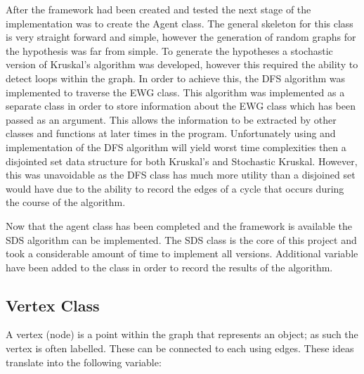 \documentclass{AISB2008}
\begin{document}
{After the framework had been created and tested the next stage of the implementation was to create the Agent class. The general skeleton for this class is very straight forward and simple, however the generation of random graphs for the hypothesis was far from simple. To generate the hypotheses a stochastic version of Kruskal’s algorithm was developed, however this required the ability to detect loops within the graph. In order to achieve this, the DFS algorithm was implemented to traverse the EWG class. This algorithm was implemented as a separate class in order to store information about the EWG class which has been passed as an argument. This allows the information to be extracted by other classes and functions at later times in the program. Unfortunately using and implementation of the DFS algorithm will yield worst time complexities then a disjointed set data structure for both Kruskal’s and Stochastic Kruskal. However, this was unavoidable as the DFS class has much more utility than a disjoined set would have due to the ability to record the edges of a cycle that occurs during the course of the algorithm.

Now that the agent class has been completed and the framework is available the SDS algorithm can be implemented. The SDS class is the core of this project and took a considerable amount of time to implement all versions.  Additional variable have been added to the class in order to record the results of the algorithm.


\subsection{Vertex Class}

A vertex (node) is a point within the graph that represents an object; as such the vertex is often labelled. These can be connected to each using edges. These ideas translate into the following variable:

}
\end{document}
